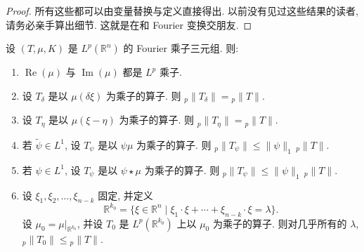 \begin{proof}
所有这些都可以由变量替换与定义直接得出. 以前没有见过这些结果的读者, 请务必亲手算出细节. 这就是在和 Fourier 变换交朋友.
\end{proof}

\begin{theorem}\label{thm:1.23}
设 $(T,\mu,K)$ 是 $L^p(\mathbb{R}^n)$ 的 Fourier 乘子三元组. 则:
\begin{enumerate}[label=\alph*)]
\item $\operatorname{Re}(\mu)$ 与 $\operatorname{Im}(\mu)$ 都是 $L^p$ 乘子.
\item 设 $T_{\delta}$ 是以 $\mu(\delta\xi)$ 为乘子的算子. 则 ${}_p\|T_{\delta}\|={}_p\|T\|$.
\item 设 $T_{\eta}$ 是以 $\mu(\xi-\eta)$ 为乘子的算子. 则 ${}_p\|T_{\eta}\|={}_p\|T\|$.
\item 若 $\tilde{\psi}\in L^1$, 设 $T_{\psi}$ 是以 $\psi\mu$ 为乘子的算子. 则 ${}_p\|T_{\psi}\|\leq\|\psi\|_1\,{}_p\|T\|$.
\item 若 $\psi\in L^1$, 设 $T_{\psi}$ 是以 $\psi\star\mu$ 为乘子的算子. 则 ${}_p\|T_{\psi}\|\leq\|\psi\|_1\,{}_p\|T\|$.
\item 设 $\xi_1,\xi_2,\ldots,\xi_{n-k}$ 固定, 并定义
\[
\mathbb{R}^{k_0}=\{\xi\in\mathbb{R}^n \mid \xi_1\cdot\xi+\cdots+\xi_{n-k}\cdot\xi=\lambda\}.
\]
设 $\mu_0=\mu|_{\mathbb{R}^{k_0}}$, 并设 $T_0$ 是 $L^p(\mathbb{R}^{k_0})$ 上以 $\mu_0$ 为乘子的算子. 则对几乎所有的 $\lambda$, ${}_p\|T_0\|\leq{}_p\|T\|$.
\end{enumerate}
\end{theorem}

